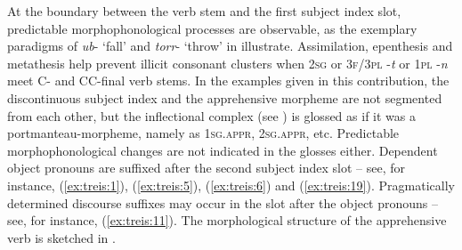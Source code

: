 \documentclass[output=paper,colorlinks,citecolor=brown,]{langscibook}
\begin{document}
\begin{table}
    \caption{The apprehensive paradigm}
    \label{tab:treis:2}
\end{table}

At the boundary between the verb stem and the first subject index slot, predictable morphophonological processes are observable, as the exemplary paradigms of \textit{ub}- `fall' and \textit{torr}- `throw' in  illustrate. Assimilation, epenthesis and metathesis help prevent illicit consonant clusters when \textsc{2sg} or \textsc{3f/3pl} -\textit{t} or \textsc{1pl} \nobreakdash-\textit{n} meet C- and CC-final verb stems. In the examples given in this contribution, the discontinuous subject index and the apprehensive morpheme are not segmented from each other, but the inflectional complex (see ) is glossed as if it was a portmanteau-morpheme, namely as \textsc{1sg.appr}, \textsc{2sg.appr}, etc. Predictable morphophonological changes are not indicated in the glosses either. 
Dependent object pronouns are suffixed after the second subject index slot -- see, for instance, (\ref{ex:treis:1}), (\ref{ex:treis:5}), (\ref{ex:treis:6}) and (\ref{ex:treis:19}). Pragmatically determined discourse suffixes may occur in the slot after the object pronouns -- see, for instance, (\ref{ex:treis:11}). The morphological structure of the apprehensive verb is sketched in .
\end{document}
